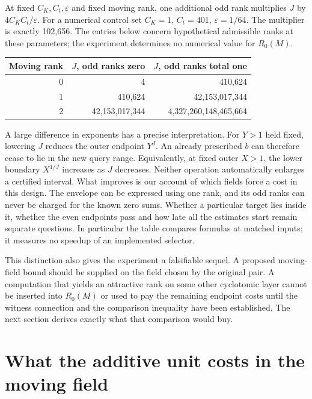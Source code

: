 \documentclass[12pt,letterpaper]{article}
\begin{document}
At fixed \(C_K,C_t,\varepsilon\) and fixed moving rank, one additional odd rank multiplies \(J\) by \(4C_KC_t/\varepsilon\). For a numerical control set \(C_K=1\), \(C_t=401\), \(\varepsilon=1/64\). The multiplier is exactly 102,656. The entries below concern hypothetical admissible ranks at these parameters; the experiment determines no numerical value for \(R_0(M)\).
\begin{center}
\begin{tabular}{rrr}\toprule
Moving rank & \(J\), odd ranks zero & \(J\), odd ranks total one\\\midrule
0 & 4 & 410,624\\
1 & 410,624 & 42,153,017,344\\
2 & 42,153,017,344 & 4,327,260,148,465,664\\\bottomrule
\end{tabular}
\end{center}
A large difference in exponents has a precise interpretation. For \(Y>1\) held fixed, lowering \(J\) reduces the outer endpoint \(Y^J\). An already prescribed \(b\) can therefore cease to lie in the new query range. Equivalently, at fixed outer \(X>1\), the lower boundary \(X^{1/J}\) increases as \(J\) decreases. Neither operation automatically enlarges a certified interval. What improves is our account of which fields force a cost in this design. The envelope can be expressed using one rank, and its odd ranks can never be charged for the known zero sums. Whether a particular target lies inside it, whether the even endpoints pass and how late all the estimates start remain separate questions. In particular the table compares formulas at matched inputs; it measures no speedup of an implemented selector.

This distinction also gives the experiment a falsifiable sequel. A proposed moving-field bound should be supplied on the field chosen by the original pair. A computation that yields an attractive rank on some other cyclotomic layer cannot be inserted into \(R_0(M)\) or used to pay the remaining endpoint costs until the witness connection and the comparison inequality have been established. The next section derives exactly what that comparison would buy.


\section{What the additive unit costs in the moving field}
\end{document}
